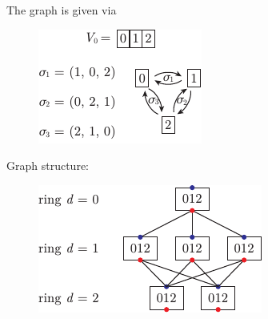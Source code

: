 



\begin{minipage}{0.55\textwidth}
	The graph is given via
    \begin{itemize}
    \end{itemize}
\end{minipage}
\hfill
\begin{minipage}{0.37\textwidth}
    \begin{figure}[h]
	    \centering
	    \includegraphics{imgs/pAsset 2.pdf}
	\end{figure}
\end{minipage}

\vfill

\begin{minipage}{0.6\textwidth}
	Graph structure:
    \begin{itemize}
    \end{itemize}
\end{minipage}
\hfill
\begin{minipage}{0.37\textwidth}
    \begin{figure}[h]
	    \centering
	    \includegraphics{imgs/pAsset 3.pdf}
	\end{figure}
\end{minipage}


